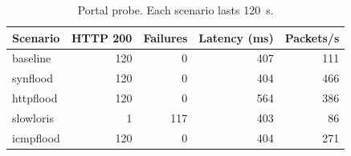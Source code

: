 \begin{table}[t]
\centering
\small
\caption{Portal probe. Each scenario lasts 120~s.}
\label{tbl:sonda}
\setlength{\tabcolsep}{4pt}
\begin{tabular}{lrrrr}
\hline
Scenario & HTTP 200 & Failures & Latency (ms) & Packets/s \\
\hline
baseline & 120 & 0 & 407 & 111 \\
synflood & 120 & 0 & 404 & 466 \\
httpflood & 120 & 0 & 564 & 386 \\
slowloris & 1 & 117 & 403 & 86 \\
icmpflood & 120 & 0 & 404 & 271 \\
\hline
\end{tabular}
\end{table}
